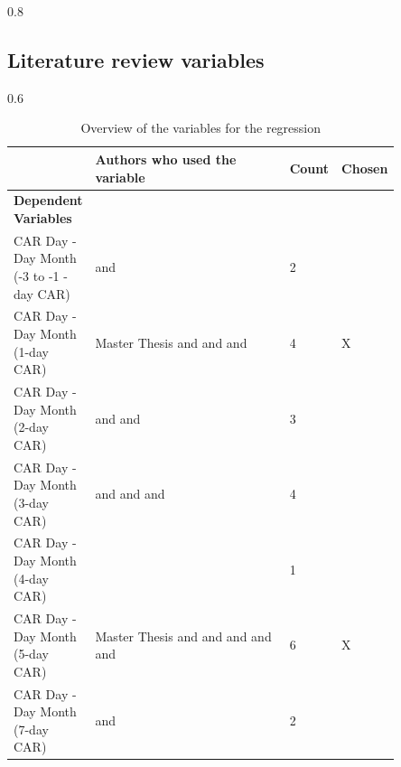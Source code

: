 \documentclass[12pt,a4paper]{article}
\begin{document}
{\begin{appendix}
\begin{landscape}
\begin{spacing}{0.8}
\begin{longtable}[c]
\end{longtable}
\end{spacing}
\end{landscape}


\begin{landscape}
\section{Literature review variables}
\begin{spacing}{0.6}
\fontsize{6}{11}\selectfont
\begin{longtable}[c]{p{0.20\linewidth} p{0.55\linewidth} p{0.05\linewidth} p{0.05\linewidth}}
\caption{Overview of the variables for the regression}
\label{variables_overview_literature}
\\
\hline
  \textbf{ } & \textbf{Authors who used the variable} & \textbf{Count} & \textbf{Chosen}\\ 
\hline
\textbf{Dependent Variables} & & &  \\
CAR Day - Day Month (-3 to -1 - day CAR) & \cite{kumari_are_2023} and \cite{li_china-us_2020} & 2 & \\
CAR Day - Day Month (1-day CAR) & Master Thesis and \cite{tee_financial_2023} and \cite{ghasseminejad_impact_2021} and \cite{kamal_impact_2023} & 4 & X\\%
CAR Day - Day Month (2-day CAR) & \cite{tee_financial_2023} and \cite{ghasseminejad_impact_2021} and \cite{kamal_impact_2023} & 3 & \\
CAR Day - Day Month (3-day CAR) & \cite{tee_financial_2023} and \cite{ghasseminejad_impact_2021} and \cite{kumari_are_2023} and \cite{kamal_impact_2023} & 4 & \\
CAR Day - Day Month (4-day CAR) & \cite{ghasseminejad_impact_2021} & 1 &\\
CAR Day - Day Month (5-day CAR) & Master Thesis and \cite{tee_financial_2023} and \cite{ghasseminejad_impact_2021} and \cite{kumari_are_2023} and \cite{kamal_impact_2023} and \cite{li_china-us_2020} & 6 & X \\
CAR Day - Day Month (7-day CAR) & \cite{ghasseminejad_impact_2021} and \cite{kumari_are_2023} & 2 & \\

\end{longtable}
\end{spacing}
\end{landscape}
\end{appendix}}
\end{document}
